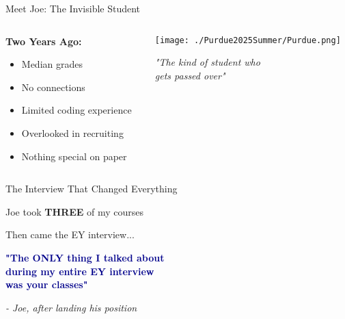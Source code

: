 \documentclass[aspectratio=169,12pt]{beamer}
\begin{document}
\begin{frame}{Meet Joe: The Invisible Student}
\begin{columns}
\begin{column}{0.5\textwidth}
\textbf{Two Years Ago:}
\begin{itemize}
\item Median grades
\item No connections
\item Limited coding experience
\item Overlooked in recruiting
\item Nothing special on paper
\end{itemize}
\end{column}
\begin{column}{0.5\textwidth}
\begin{center}
\texttt{[image: ./Purdue2025Summer/Purdue.png]}

\vspace{0.5cm}
\textit{"The kind of student who\\gets passed over"}
\end{center}
\end{column}
\end{columns}
\end{frame}

\begin{frame}{The Interview That Changed Everything}
\begin{center}
\Large
Joe took \textbf{THREE} of my courses

\vspace{0.5cm}
\normalsize
Then came the EY interview...

\vspace{0.8cm}
\LARGE
\textcolor{darkblue}{\textbf{"The ONLY thing I talked about\\
during my entire EY interview\\
was your classes"}}

\vspace{0.8cm}
\normalsize
\textit{- Joe, after landing his position}
\end{center}
\end{frame}
\end{document}
